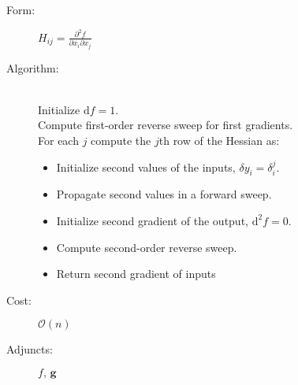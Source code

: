 \begin{tcolorbox}[colback=white,colframe=gray90, coltitle=black,boxrule=3pt,
fonttitle=\bfseries,title=Hessian]
	
	\begin{description}
		\item[Form:] $\displaystyle H_{ij} = \frac{ \partial^{2} f }{ \partial x_{i} \partial x_{j} } $
		\item[Algorithm:] \hfill \\
		Initialize $\mathrm{d} f = 1$. \\
		Compute first-order reverse sweep for first gradients. \\
		For each $j$ compute the $j$th row of the Hessian as:
		\begin{itemize}
			\setlength{\itemsep}{0cm}
			\setlength{\parskip}{0cm}
			\item[] Initialize second values of the inputs, $\delta y_{i} = \delta^{j}_{i}$.
			\item[] Propagate second values in a forward sweep. 
			\item[] Initialize second gradient of the output, $\mathrm{d}^{2} f = 0$.
			\item[] Compute second-order reverse sweep.
			\item[] Return second gradient of inputs
		\end{itemize}
		\item[Cost:] $\mathcal{O} \! \left( n \right)$
		\item[Adjuncts:] $ f, \, \mathbf{g}$
	\end{description}
	
\end{tcolorbox}

